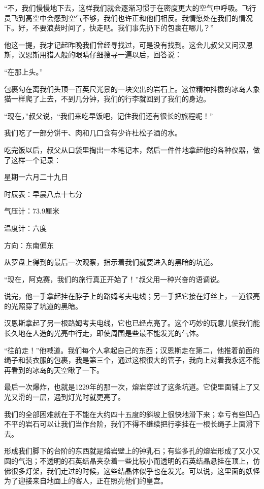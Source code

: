 \documentclass[10pt]{book}
\begin{document}
“不，我们慢慢地下去，这样我们就会逐渐习惯于在密度更大的空气中呼吸。飞行员飞到高空中会感到空气不够，我们也许正和他们相反。我情愿处在我们的情况下。好，不要浪费时间了，快走吧。我们事先扔下的包裹在哪儿？”

他这一提，我才记起昨晚我们曾经寻找过，可是没有找到。这会儿叔父又问汉恩斯，汉恩斯用猎人般的眼睛仔细搜寻一遍以后，回答说：

“在那上头。”

包裹勾在离我们头顶一百英尺光景的一块突出的岩石上。这位精神抖擞的冰岛人象猫一样爬了上去，不到几分钟，我们的行李就回到了我们的身边。

“现在，”叔父说，“我们来吃早饭吧，记住我们还有很长的旅程呢！”

我们吃了一部分饼干、肉和几口含有少许杜松子酒的水。

吃完饭以后，叔父从口袋里掏出一本笔记本，然后一件件地拿起他的各种仪器，做了这样一个记录：

星期一六月二十九日

时辰表：早晨八点十七分

气压计：73.9厘米

温度计：六度

方向：东南偏东

从罗盘上得到的最后一次观察，指示着我们就要进入的黑暗的坑道。

“现在，阿克赛，我们的旅行真正开始了！”叔父用一种兴奋的语调说。

说完，他一手拿起挂在脖子上的路姆考夫电线；另一手把它接在灯丝上，一道很亮的光照穿了坑道的黑暗。

汉恩斯拿起了另一根路姆考夫电线，它也已经点亮了。这个巧妙的玩意儿使我们能长久地在人造的光亮中行走，即使周围是些最不能发光的气体。

“往前走！”他喊道。我们每个人拿起自己的东西；汉恩斯走在第二，他推着前面的绳子和装衣服的包裹，我是第三个，通过这根很大的管子，我向上对着我永远不能再看到的冰岛的天空瞅了一下。

最后一次爆炸，也就是1229年的那一次，熔岩穿过了这条坑道。它使里面铺上了又光又滑的一层，遇到灯光时就更亮了。

我们的全部困难就在于不能在大约四十五度的斜坡上很快地滑下来；幸亏有些凹凸不平的岩石可以让我们当作台阶，我们不得不继续把行李挂在一根长绳子上面滑下去。

形成我们脚下的台阶的东西就是熔岩壁上的钟乳石；有些多孔的熔岩形成了又小又圆的气泡；不透明的石英结晶夹杂着一些比较小而透明的石英结晶悬挂在顶上，仿佛很多灯架，我们走过的时候，这些结晶体似乎也在发光。可以说，这里面的妖怪为了迎接来自地面上的客人，正在照亮他们的皇宫。
\end{document}
